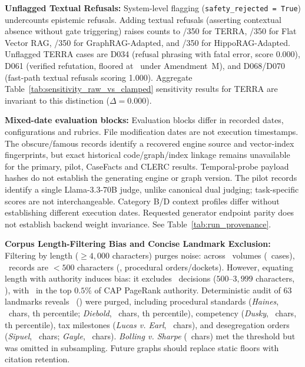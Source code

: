 \item \textbf{Unflagged Textual Refusals:}
System-level flagging (\texttt{safety\_rejected = True}) undercounts epistemic refusals. Adding textual refusals (asserting contextual absence without gate triggering) raises counts to \TerraEpistemicRefusals/350 for TERRA, \FlatEpistemicRefusals/350 for Flat Vector RAG, \GraphEpistemicRefusals/350 for GraphRAG-Adapted, and \HippoEpistemicRefusals/350 for HippoRAG-Adapted. Unflagged TERRA cases are D034 (refusal phrasing with fatal error, score 0.000), D061 (verified refutation, floored at \AmendmentMFloorScore\ under Amendment~M), and D068/D070 (fast-path textual refusals scoring 1.000). Aggregate Table~\ref{tab:sensitivity_raw_vs_clamped} sensitivity results for TERRA are invariant to this distinction ($\Delta = 0.000$).

\item \textbf{Mixed-date evaluation blocks:} Evaluation blocks differ in recorded dates, configurations and rubrics. File modification dates are not execution timestamps. The obscure/famous records identify a recovered engine source and vector-index fingerprints, but exact historical code/graph/index linkage remains unavailable for the primary, pilot, CaseFacts and CLERC results. Temporal-probe payload hashes do not establish the generating engine or graph version. The pilot records identify a single Llama-3.3-70B judge, unlike canonical dual judging; task-specific scores are not interchangeable. Category B/D context profiles differ without establishing different execution dates. Requested generator endpoint parity does not establish backend weight invariance. See Table~\ref{tab:run_provenance}.

\item \textbf{Corpus Length-Filtering Bias and Concise Landmark Exclusion:}
Filtering by length ($\ge 4{,}000$ characters) purges noise: across \IssueTwentyTotalVolumesScanned\ volumes (\IssueTwentyTotalDecisionsScanned\ cases), \IssueTwentySubFiveHundredCharCount\ records are $<500$ characters (\IssueTwentySubFiveHundredCharPct, procedural orders/dockets). However, equating length with authority induces bias: it excludes \IssueTwentyIntermediateExcludedCount\ decisions ($500$--$3{,}999$ characters, \IssueTwentyIntermediateExcludedPct), with \IssueTwentyIntermediatePageRankGeNinetyNineFive\ in the top $0.5\%$ of CAP PageRank authority. Deterministic audit of 63 landmarks reveals \IssueTwentyLandmarksExcludedByLength\ (\IssueTwentyLandmarksExcludedByLengthPct) were purged, including procedural standards (\textit{Haines}, \IssueTwentyHainesCharCount\ chars, \IssueTwentyHainesCAPPRPercentile th percentile; \textit{Diebold}, \IssueTwentyDieboldCharCount\ chars, \IssueTwentyDieboldCAPPRPercentile th percentile), competency (\textit{Dusky}, \IssueTwentyDuskyCharCount\ chars, \IssueTwentyDuskyCAPPRPercentile th percentile), tax milestones (\textit{Lucas v. Earl}, \IssueTwentyLucasCharCount\ chars), and desegregation orders (\textit{Sipuel}, \IssueTwentySipuelCharCount\ chars; \textit{Gayle}, \IssueTwentyGayleCharCount\ chars). \textit{Bolling v. Sharpe} (\IssueTwentyBollingCharCount\ chars) met the threshold but was omitted in subsampling. Future graphs should replace static floors with citation retention.

